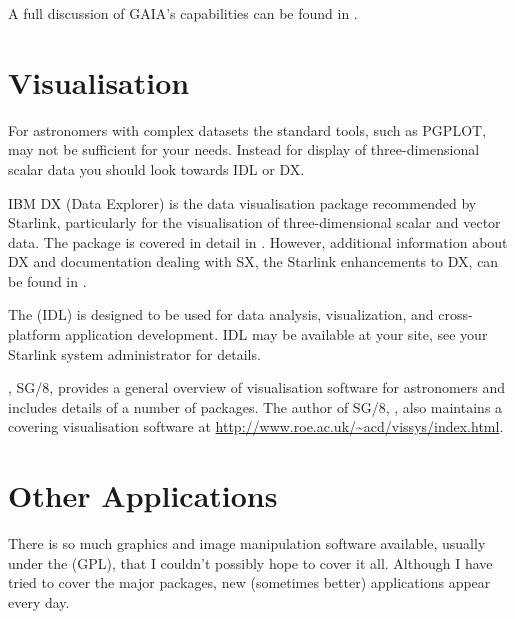 \documentclass[twoside,11pt]{starlink}
\begin{document}

A full discussion of GAIA's capabilities can be found in .

\section{Visualisation\label{sc15_visualisation}}

For astronomers with complex datasets the standard tools, such as
PGPLOT, may not be sufficient for your needs. Instead for display of
three-dimensional scalar data you should look towards IDL or DX.

IBM DX (Data Explorer) is the data visualisation package recommended
by Starlink, particularly for the visualisation of three-dimensional
scalar and vector data. The package is covered in detail in . However, additional information about
DX and documentation dealing with SX, the Starlink enhancements to DX,
can be found in .

The  (IDL) is designed to be
used for data analysis, visualization, and cross-platform application
development. IDL may be available at your site, see your Starlink
system administrator for details.

, SG/8, provides a general overview of visualisation
software for astronomers and includes details of a number of packages.
The author of SG/8, , also maintains a
 covering
visualisation software  at \url{http://www.roe.ac.uk/~acd/vissys/index.html}.

\section{Other Applications\label{sc15_applications}}

There is so much graphics and image manipulation software available,
usually under the  (GPL), that I couldn't
possibly hope to cover it all. Although I have tried to cover the
major packages, new (sometimes better) applications appear every day.
\end{document}
